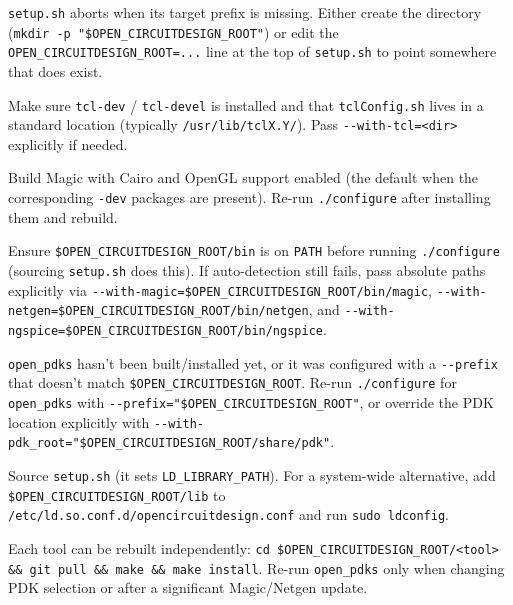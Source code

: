 \documentclass[11pt]{article}
\begin{document}
\begin{description}[leftmargin=0em, style=nextline]
  \item[\texttt{ERROR: Directory \$OPEN\_CIRCUITDESIGN\_ROOT does not exist}]
    \texttt{setup.sh} aborts when its target prefix is missing. Either
    create the directory (\texttt{mkdir -p "\$OPEN\_CIRCUITDESIGN\_ROOT"})
    or edit the \texttt{OPEN\_CIRCUITDESIGN\_ROOT=...} line at the top of
    \texttt{setup.sh} to point somewhere that does exist.

  \item[\texttt{configure: error: Tcl headers not found}]
    Make sure \texttt{tcl-dev} / \texttt{tcl-devel} is installed and that
    \texttt{tclConfig.sh} lives in a standard location (typically
    \texttt{/usr/lib/tclX.Y/}). Pass \texttt{-{}-with-tcl=<dir>} explicitly
    if needed.

  \item[Magic launches but graphics are missing]
    Build Magic with Cairo and OpenGL support enabled (the default when
    the corresponding \texttt{-dev} packages are present). Re-run
    \texttt{./configure} after installing them and rebuild.

  \item[\texttt{open\_pdks} fails to find Magic / Netgen]
    Ensure \texttt{\$OPEN\_CIRCUITDESIGN\_ROOT/bin} is on \texttt{PATH}
    before running \texttt{./configure} (sourcing \texttt{setup.sh} does
    this). If auto-detection still fails, pass absolute paths explicitly
    via \texttt{-{}-with-magic=\$OPEN\_CIRCUITDESIGN\_ROOT/bin/magic},
    \texttt{-{}-with-netgen=\$OPEN\_CIRCUITDESIGN\_ROOT/bin/netgen}, and
    \texttt{-{}-with-ngspice=\$OPEN\_CIRCUITDESIGN\_ROOT/bin/ngspice}.

  \item[\texttt{setup.sh} warns ``\texttt{No PDK directory found}'']
    \texttt{open\_pdks} hasn't been built/installed yet, or it was
    configured with a \texttt{-{}-prefix} that doesn't match
    \texttt{\$OPEN\_CIRCUITDESIGN\_ROOT}. Re-run \texttt{./configure} for
    \texttt{open\_pdks} with
    \texttt{-{}-prefix="\$OPEN\_CIRCUITDESIGN\_ROOT"}, or override the PDK
    location explicitly with
    \texttt{-{}-with-pdk\_root="\$OPEN\_CIRCUITDESIGN\_ROOT/share/pdk"}.

  \item[Shared libraries not found at runtime]
    Source \texttt{setup.sh} (it sets \texttt{LD\_LIBRARY\_PATH}). For a
    system-wide alternative, add \texttt{\$OPEN\_CIRCUITDESIGN\_ROOT/lib}
    to \texttt{/etc/ld.so.conf.d/opencircuitdesign.conf} and run
    \texttt{sudo ldconfig}.

  \item[Updating later]
    Each tool can be rebuilt independently:
    \texttt{cd \$OPEN\_CIRCUITDESIGN\_ROOT/<tool> \&\& git pull \&\& make \&\& make install}.
    Re-run \texttt{open\_pdks} only when changing PDK selection or after a
    significant Magic/Netgen update.
\end{description}
\end{document}

